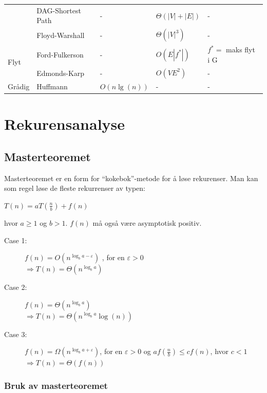 \documentclass[a4paper, norsk,  10pt]{article}
\begin{document}
\begin{center}
\begin{table}[h]
{\begin{tabular}{|l|l|l|l|l|}
			& DAG-Shortest Path &- & $\Theta(|V| + |E|)$ &- \\ \cline{2-5}
			& Floyd-Warshall &- & $\Theta({|V|^{3}})$  &- \\ \cline{2-5} 
			\hline
\multirow{2}{*}{Flyt} & Ford-Fulkerson &- & $O(E|f^*|)$ & ${f^{*}} = $ maks flyt i G \\ \cline{2-5}
			& Edmonds-Karp &- & $O(VE^2)$ &- \\ \cline{2-5}
			\hline
\multirow{1}{*}{Grådig} & Huffmann & $O(n \lg(n))$ &- & -\\ \cline{2-5}
			\hline
\end{tabular}}
\end{table}
\end{center}

\section{Rekurensanalyse}

\subsection{Masterteoremet}

Masterteoremet er en form for ``kokebok''-metode for å løse rekurenser. Man kan som regel løse de fleste rekurrenser av typen: 

\begin{center}
$T(n) = aT(\frac{n}{b}) + f(n)$
\end{center}
\noindent hvor $a \ge 1$ og $b > 1$. $f(n)$ må også være asymptotisk positiv. \\ \hfill

\begin{description}
\item[Case 1:] $f(n) = O(n^{\log_{b}a - \varepsilon})$ , for en $\varepsilon > 0$ \\ $\Rightarrow T(n) = \Theta(n^{\log_{b}a})$ 
\item[Case 2:] $f(n) = \Theta(n^{\log_{b}a})$  \\  $\Rightarrow T(n) = \Theta(n^{\log_{b}a} \log(n))$ 
\item[Case 3:] $f(n) = \Omega(n^{\log_{b}a + \varepsilon})$, for en $\varepsilon > 0$ og $af(\frac{n}{b}) \leq cf(n)$, hvor $c < 1$ \\  $\Rightarrow T(n) = \Theta(f(n))$
\end{description}

\subsubsection{Bruk av masterteoremet}
\end{document}
